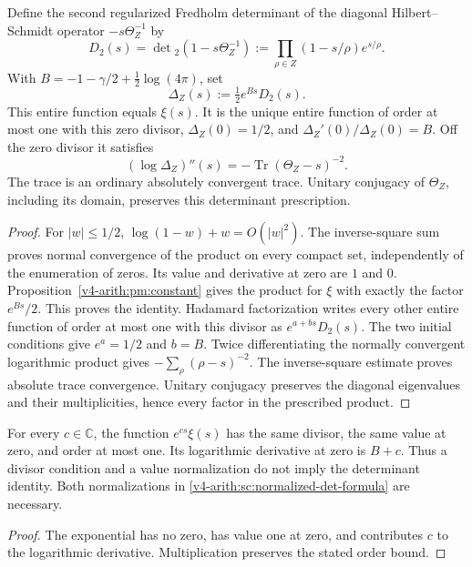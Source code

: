 \begin{theorem}
\label{v4-arith:sc:normalized-det}
\label{v4-arith:w5-b:prop:det-formal}
Define the second regularized Fredholm determinant of the diagonal
Hilbert--Schmidt operator $-s\Theta_Z^{-1}$ by
\[
 D_2(s)=\det{}_2(1-s\Theta_Z^{-1})
       :=\prod_{\rho\in Z}(1-s/\rho)e^{s/\rho}.
\]
With $B=-1-\gamma/2+\tfrac12\log(4\pi)$, set
\begin{equation}
 \Delta_Z(s):=\tfrac12e^{Bs}D_2(s).
 \label{v4-arith:sc:normalized-det-formula}
\end{equation}
This entire function equals $\xi(s)$.
It is the unique entire function of order at most one with this
zero divisor, $\Delta_Z(0)=1/2$, and $\Delta_Z'(0)/\Delta_Z(0)=B$.
Off the zero divisor it satisfies
\[
 (\log\Delta_Z)''(s)
       =-\operatorname{Tr}(\Theta_Z-s)^{-2}.
\]
The trace is an ordinary absolutely convergent trace.
Unitary conjugacy of $\Theta_Z$, including its domain, preserves
this determinant prescription.
\end{theorem}
\begin{proof}
For $|w|\le1/2$, $\log(1-w)+w=O(|w|^2)$.
The inverse-square sum proves normal convergence of the product
on every compact set, independently of the enumeration of zeros.
Its value and derivative at zero are $1$ and $0$.
Proposition~\ref{v4-arith:pm:constant} gives the product for $\xi$
with exactly the factor $e^{Bs}/2$. This proves the identity.
Hadamard factorization writes every other entire function of order
at most one with this divisor as $e^{a+bs}D_2(s)$.
The two initial conditions give $e^a=1/2$ and $b=B$.
Twice differentiating the normally convergent logarithmic product
gives $-\sum_\rho(\rho-s)^{-2}$.
The inverse-square estimate proves absolute trace convergence.
Unitary conjugacy preserves the diagonal eigenvalues and their
multiplicities, hence every factor in the prescribed product.
\end{proof}

\begin{proposition}
\label{v4-arith:sc:det-ambiguity}
For every $c\in\mathbb C$, the function $e^{cs}\xi(s)$ has the same
divisor, the same value at zero, and order at most one.
Its logarithmic derivative at zero is $B+c$.
Thus a divisor condition and a value normalization do not imply
the determinant identity. Both normalizations in
\eqref{v4-arith:sc:normalized-det-formula} are necessary.
\end{proposition}
\begin{proof}
The exponential has no zero, has value one at zero, and contributes
$c$ to the logarithmic derivative. Multiplication preserves the
stated order bound.
\end{proof}

